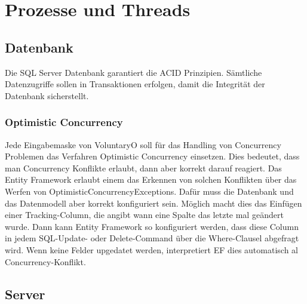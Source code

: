 \chapter{Prozesse und Threads}
	\section{Datenbank}
	Die SQL Server Datenbank garantiert die ACID Prinzipien. Sämtliche Datenzugriffe sollen in Transaktionen erfolgen, damit die Integrität der Datenbank sicherstellt.
	
	\subsection{Optimistic Concurrency}
	Jede Eingabemaske von VoluntaryO soll für das Handling von Concurrency Problemen das Verfahren Optimistic Concurrency einsetzen. Dies bedeutet, dass man Concurrency Konflikte erlaubt, dann aber korrekt darauf reagiert.
Das Entity Framework erlaubt einem das Erkennen von solchen Konflikten über das Werfen von OptimisticConcurrencyExceptions. Dafür muss die Datenbank und das Datenmodell aber korrekt konfiguriert sein.
Möglich macht dies das Einfügen einer Tracking-Column, die angibt wann eine Spalte das letzte mal geändert wurde. Dann kann Entity Framework so konfiguriert werden, dass diese Column in jedem SQL-Update- oder Delete-Command über die Where-Clausel abgefragt wird. Wenn keine Felder upgedatet werden, interpretiert EF dies automatisch al Concurrency-Konflikt.


	
	\section{Server}
	
	